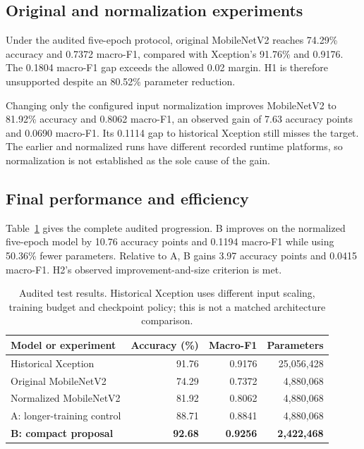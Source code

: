 \documentclass[11pt,a4paper]{article}
\begin{document}
\subsection{Original and normalization experiments}
Under the audited five-epoch protocol, original MobileNetV2 reaches 74.29\%
accuracy and 0.7372 macro-F1, compared with Xception's 91.76\% and 0.9176.
The 0.1804 macro-F1 gap exceeds the allowed 0.02 margin. H1 is therefore
unsupported despite an 80.52\% parameter reduction.

Changing only the configured input normalization improves MobileNetV2 to
81.92\% accuracy and 0.8062 macro-F1, an observed gain of 7.63 accuracy points
and 0.0690 macro-F1. Its 0.1114 gap to historical Xception still misses the
target. The earlier and normalized runs have different recorded runtime
platforms, so normalization is not established as the sole cause of the gain.

\subsection{Final performance and efficiency}
Table~\ref{tab:final} gives the complete audited progression. B improves on the
normalized five-epoch model by 10.76 accuracy points and 0.1194 macro-F1 while
using 50.36\% fewer parameters. Relative to A, B gains 3.97 accuracy points and
0.0415 macro-F1. H2's observed improvement-and-size criterion is met.

\begin{table}[tb]
\centering\small
\caption{Audited test results. Historical Xception uses different input scaling, training
budget and checkpoint policy; this is not a matched architecture comparison.}
\label{tab:final}
\begin{tabularx}{\linewidth}{@{}Xrrr@{}}
\toprule
Model or experiment & Accuracy (\%) & Macro-F1 & Parameters\\
\midrule
Historical Xception & 91.76 & 0.9176 & 25,056,428\\
Original MobileNetV2 & 74.29 & 0.7372 & 4,880,068\\
Normalized MobileNetV2 & 81.92 & 0.8062 & 4,880,068\\
A: longer-training control & 88.71 & 0.8841 & 4,880,068\\
\textbf{B: compact proposal} & \textbf{92.68} & \textbf{0.9256} & \textbf{2,422,468}\\
\bottomrule
\end{tabularx}
\end{table}
\end{document}
